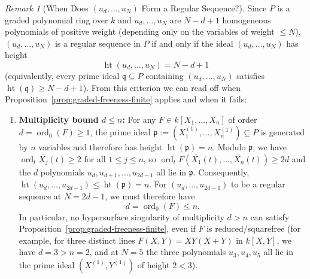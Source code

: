 \documentclass[a4paper, 12pt]{amsart}
\theoremstyle{remark}
\newtheorem{remark}[theorem]{Remark}
\begin{document}
\begin{remark}[When Does $(u_d, \dots, u_N)$ Form a Regular Sequence?]
\label{rmk:obstruction-non-squarefree}
Since $P$ is a graded polynomial ring over $k$ and $u_d, \dots, u_N$ are $N - d + 1$ homogeneous polynomials of positive weight (depending only on the variables of weight $\le N$),
$(u_d, \dots, u_N)$ is a regular sequence in $P$ if and only if the ideal $(u_d, \dots, u_N)$ has height
\begin{equation*}
  \operatorname{ht}(u_d, \dots, u_N) = N - d + 1
\end{equation*}
(equivalently, every prime ideal $\mathfrak{q} \subseteq P$ containing $(u_d, \dots, u_N)$ satisfies $\operatorname{ht}(\mathfrak{q}) \ge N - d + 1$).
From this criterion we can read off when Proposition~\ref{prop:graded-freeness-finite} applies and when it fails:
\begin{enumerate}
  \item \textbf{Multiplicity bound $d \le n$:}
  For any $F \in k[X_1, \dots, X_n]$ of order $d = \operatorname{ord}_0(F) \ge 1$,
  the prime ideal $\mathfrak{p} := (X_1^{(1)}, \dots, X_n^{(1)}) \subseteq P$ is generated by $n$ variables and therefore has height $\operatorname{ht}(\mathfrak{p}) = n$.
  Modulo $\mathfrak{p}$,
  we have $\operatorname{ord}_t \overline{X_j}(t) \ge 2$ for all $1 \le j \le n$,
  so $\operatorname{ord}_t F(\overline{X_1}(t), \dots, \overline{X_n}(t)) \ge 2 d$ and the $d$ polynomials $u_d, u_{d + 1}, \dots, u_{2d - 1}$ all lie in $\mathfrak{p}$.
  Consequently,
  $\operatorname{ht}(u_d, \dots, u_{2d - 1}) \le \operatorname{ht}(\mathfrak{p}) = n$.
  For $(u_d, \dots, u_{2d - 1})$ to be a regular sequence at $N = 2d - 1$,
  we must therefore have
  \begin{equation*}
    d = \operatorname{ord}_0(F) \le n.
  \end{equation*}
  In particular,
  no hypersurface singularity of multiplicity $d > n$ can satisfy Proposition~\ref{prop:graded-freeness-finite},
  even if $F$ is reduced/squarefree
  (for example, for three distinct lines $F(X, Y) = X Y (X + Y)$ in $k[X, Y]$, we have $d = 3 > n = 2$, and at $N = 5$ the three polynomials $u_3, u_4, u_5$ all lie in the prime ideal $(X^{(1)}, Y^{(1)})$ of height $2 < 3$).


\end{enumerate}
\end{remark}
\end{document}
